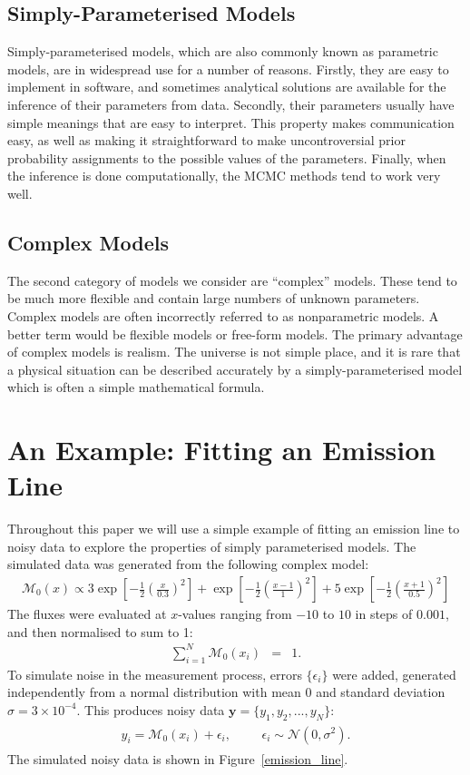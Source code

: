 \documentclass[letterpaper, 11pt]{article}
\begin{document}
\subsection{Simply-Parameterised Models}
Simply-parameterised models, which are also
commonly known as parametric models, are in widespread use for a number of reasons.
Firstly, they are easy to implement in software, and sometimes analytical
solutions are available for the inference of their parameters from data.
Secondly, their parameters usually have simple meanings that are easy to interpret.
This property makes communication easy, as well as making it straightforward to
make uncontroversial prior probability
assignments to the possible values of the parameters. Finally, when the inference
is done computationally, the MCMC methods tend to work very well.

\subsection{Complex Models}
The second category of models we consider are ``complex'' models. These tend to
be much more flexible and contain large numbers of unknown parameters. Complex
models are often incorrectly referred to as nonparametric models. A better term
would be flexible models or free-form models. The primary advantage of complex models is realism. The universe is not
simple place, and it is rare that a physical situation can be described accurately
by a simply-parameterised model which is often a simple mathematical formula.

\section{An Example: Fitting an Emission Line}
Throughout this paper we will use a simple example of fitting an emission line
to noisy data to explore the properties of simply parameterised models. The
simulated data was generated from the following complex model:
\begin{eqnarray}
\mathcal{M}_0(x) \propto 3\exp\left[-\frac{1}{2}\left(\frac{x}{0.3}\right)^2\right]
+ \exp\left[-\frac{1}{2}\left(\frac{x - 1}{1}\right)^2\right]
+ 5\exp\left[-\frac{1}{2}\left(\frac{x + 1}{0.5}\right)^2\right]
\label{eqn:truth}
\end{eqnarray}
The fluxes were evaluated at $x$-values ranging from $-10$ to $10$ in steps
of $0.001$, and then normalised to sum to 1:
\begin{eqnarray}
\sum_{i=1}^N \mathcal{M}_0(x_i) &=& 1.
\end{eqnarray}
To simulate noise in the measurement process, errors $\{\epsilon_i\}$ were
added, generated
independently from a normal distribution with mean 0 and standard deviation
$\sigma = 3 \times 10^{-4}$.
This produces noisy data $\mathbf{y} = \{y_1, y_2, ..., y_N\}$:
\begin{eqnarray}
\begin{array}{lccr}
y_i = \mathcal{M}_0(x_i) + \epsilon_i, & & & \epsilon_i \sim \mathcal{N}(0, \sigma^2).
\end{array}
\end{eqnarray}
The simulated noisy data is shown in Figure~\ref{emission_line}.
\end{document}
